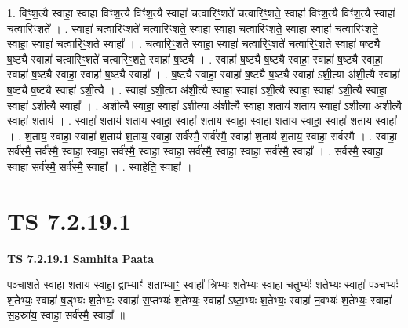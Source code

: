 \documentclass[17pt]{extarticle}
\begin{document}
1. विꣳ॒॒श॒त्यै स्वाहा॒ स्वाहा॑ विꣳश॒त्यै विꣳ॑श॒त्यै स्वाहा॑ चत्वारिꣳ॒॒शते॑ चत्वारिꣳ॒॒शते॒ स्वाहा॑ विꣳश॒त्यै विꣳ॑श॒त्यै स्वाहा॑ चत्वारिꣳ॒॒शते᳚ । . स्वाहा॑ चत्वारिꣳ॒॒शते॑ चत्वारिꣳ॒॒शते॒ स्वाहा॒ स्वाहा॑ चत्वारिꣳ॒॒शते॒ स्वाहा॒ स्वाहा॑ चत्वारिꣳ॒॒शते॒ स्वाहा॒ स्वाहा॑ चत्वारिꣳ॒॒शते॒ स्वाहा᳚ । . च॒त्वा॒रिꣳ॒॒शते॒ स्वाहा॒ स्वाहा॑ चत्वारिꣳ॒॒शते॑ चत्वारिꣳ॒॒शते॒ स्वाहा॑ ष॒ष्ट्यै ष॒ष्ट्यै स्वाहा॑ चत्वारिꣳ॒॒शते॑ चत्वारिꣳ॒॒शते॒ स्वाहा॑ ष॒ष्ट्यै । . स्वाहा॑ ष॒ष्ट्यै ष॒ष्ट्यै स्वाहा॒ स्वाहा॑ ष॒ष्ट्यै स्वाहा॒ स्वाहा॑ ष॒ष्ट्यै स्वाहा॒ स्वाहा॑ ष॒ष्ट्यै स्वाहा᳚ । . ष॒ष्ट्यै स्वाहा॒ स्वाहा॑ ष॒ष्ट्यै ष॒ष्ट्यै स्वाहा॑ ऽशी॒त्या अ॑शी॒त्यै स्वाहा॑ ष॒ष्ट्यै ष॒ष्ट्यै स्वाहा॑ ऽशी॒त्यै । . स्वाहा॑ ऽशी॒त्या अ॑शी॒त्यै स्वाहा॒ स्वाहा॑ ऽशी॒त्यै स्वाहा॒ स्वाहा॑ ऽशी॒त्यै स्वाहा॒ स्वाहा॑ ऽशी॒त्यै स्वाहा᳚ । . अ॒शी॒त्यै स्वाहा॒ स्वाहा॑ ऽशी॒त्या अ॑शी॒त्यै स्वाहा॑ श॒ताय॑ श॒ताय॒ स्वाहा॑ ऽशी॒त्या अ॑शी॒त्यै स्वाहा॑ श॒ताय॑ । . स्वाहा॑ श॒ताय॑ श॒ताय॒ स्वाहा॒ स्वाहा॑ श॒ताय॒ स्वाहा॒ स्वाहा॑ श॒ताय॒ स्वाहा॒ स्वाहा॑ श॒ताय॒ स्वाहा᳚ । . श॒ताय॒ स्वाहा॒ स्वाहा॑ श॒ताय॑ श॒ताय॒ स्वाहा॒ सर्व॑स्मै॒ सर्व॑स्मै॒ स्वाहा॑ श॒ताय॑ श॒ताय॒ स्वाहा॒ सर्व॑स्मै । . स्वाहा॒ सर्व॑स्मै॒ सर्व॑स्मै॒ स्वाहा॒ स्वाहा॒ सर्व॑स्मै॒ स्वाहा॒ स्वाहा॒ सर्व॑स्मै॒ स्वाहा॒ स्वाहा॒ सर्व॑स्मै॒ स्वाहा᳚ । . सर्व॑स्मै॒ स्वाहा॒ स्वाहा॒ सर्व॑स्मै॒ सर्व॑स्मै॒ स्वाहा᳚ । . स्वाहेति॒ स्वाहा᳚ । \newline
\pagebreak
{}

\section{ TS 7.2.19.1 }

\textbf{TS 7.2.19.1 } \newline
\textbf{Samhita Paata} \newline

प॒ञ्चा॒शते॒ स्वाहा॑ श॒ताय॒ स्वाहा॒ द्वाभ्याꣳ॑ श॒ताभ्याꣳ॒॒ स्वाहा᳚ त्रि॒भ्यः श॒तेभ्यः॒ स्वाहा॑ च॒तुर्भ्यः॑ श॒तेभ्यः॒ स्वाहा॑ प॒ञ्चभ्यः॑ श॒तेभ्यः॒ स्वाहा॑ ष॒ड्भ्यः श॒तेभ्यः॒ स्वाहा॑ स॒प्तभ्यः॑ श॒तेभ्यः॒ स्वाहा᳚ ऽष्टा॒भ्यः श॒तेभ्यः॒ स्वाहा॑ न॒वभ्यः॑ श॒तेभ्यः॒ स्वाहा॑ स॒हस्रा॑य॒ स्वाहा॒ सर्व॑स्मै॒ स्वाहा᳚ ॥ \newline
\end{document}

